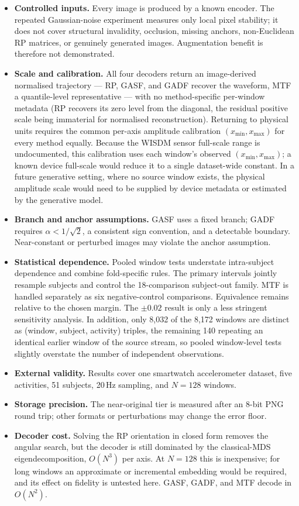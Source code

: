 \documentclass[5p]{elsarticle}
\begin{document}
\begin{itemize}
\item \textbf{Controlled inputs.} Every image is produced by a known encoder. The repeated Gaussian-noise experiment measures only local pixel stability; it does not cover structural invalidity, occlusion, missing anchors, non-Euclidean RP matrices, or genuinely generated images. Augmentation benefit is therefore not demonstrated.
\item \textbf{Scale and calibration.} All four decoders return an image-derived normalised trajectory --- RP, GASF, and GADF recover the waveform, MTF a quantile-level representative --- with no method-specific per-window metadata (RP recovers its zero level from the diagonal, the residual positive scale being immaterial for normalised reconstruction). Returning to physical units requires the common per-axis amplitude calibration \((x_{\min},x_{\max})\) for every method equally. Because the WISDM sensor full-scale range is undocumented, this calibration uses each window's observed \((x_{\min},x_{\max})\); a known device full-scale would reduce it to a single dataset-wide constant. In a future generative setting, where no source window exists, the physical amplitude scale would need to be supplied by device metadata or estimated by the generative model.
\item \textbf{Branch and anchor assumptions.} GASF uses a fixed branch; GADF requires \(\alpha<1/\sqrt2\), a consistent sign convention, and a detectable boundary. Near-constant or perturbed images may violate the anchor assumption.
\item \textbf{Statistical dependence.} Pooled window tests understate intra-subject dependence and combine fold-specific rules. The primary intervals jointly resample subjects and control the 18-comparison subject-out family. MTF is handled separately as six negative-control comparisons. Equivalence remains relative to the chosen margin. The \(\pm0.02\) result is only a less stringent sensitivity analysis. In addition, only 8,032 of the 8,172 windows are distinct as (window, subject, activity) triples, the remaining 140 repeating an identical earlier window of the source stream, so pooled window-level tests slightly overstate the number of independent observations.
\item \textbf{External validity.} Results cover one smartwatch accelerometer dataset, five activities, 51 subjects, 20\,Hz sampling, and \(N=128\) windows.
\item \textbf{Storage precision.} The near-original tier is measured after an 8-bit PNG round trip; other formats or perturbations may change the error floor.
\item \textbf{Decoder cost.} Solving the RP orientation in closed form removes the angular search, but the decoder is still dominated by the classical-MDS eigendecomposition, \(O(N^3)\) per axis. At \(N=128\) this is inexpensive; for long windows an approximate or incremental embedding would be required, and its effect on fidelity is untested here. GASF, GADF, and MTF decode in \(O(N^2)\).
\end{itemize}
\end{document}
